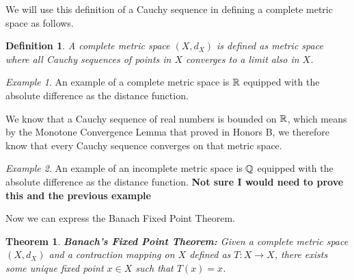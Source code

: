 \documentclass{article}
\newtheorem{theorem}{Theorem}[section]
\newtheorem{definition}{Definition}
\theoremstyle{remark}
\newtheorem{example}{Example}
\begin{document}
We will use this definition of a Cauchy sequence in defining a complete metric space as follows.

\begin{definition} A complete metric space $(X, d_X)$ is defined as metric space where all Cauchy sequences of points in $X$ converges to a limit also in $X$. 
\end{definition}

\begin{example}
An example of a complete metric space is $\Bbb R$ equipped with the absolute difference as the distance function.

We know that a Cauchy sequence of real numbers is bounded on $\Bbb R$, which means by the Monotone Convergence Lemma that proved in Honors B, we therefore know that every Cauchy sequence converges on that metric space.
\end{example}

\begin{example}
An example of an incomplete metric space is $\Bbb Q$ equipped with the absolute difference as the distance function.
\textbf{Not sure I would need to prove this and the previous example}
\end{example}

Now we can express the Banach Fixed Point Theorem.\\

\begin{theorem} \textbf{Banach's Fixed Point Theorem:} Given a complete metric space $(X, d_X)$ and a contraction mapping on $X$ defined as $T: X \to X$, there exists some unique fixed point $x \in X$ such that $T(x) = x$. 
\end{theorem}
\end{document}
